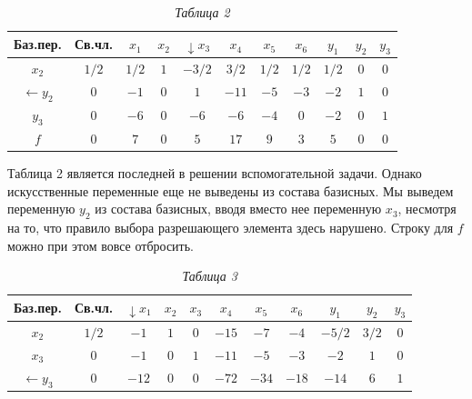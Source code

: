 \begin{table}[h]
\caption*{\hspace{0.8\linewidth} \textit{Таблица 2}}
\begin{center}
\renewcommand{\tabcolsep}{6,4pt}
\begin{tabular}{ | c | c | c | c | c | c | c | c | c | c | c | }
\hline
Баз.пер. & Св.чл. & $x_{1}$ & $x_{2}$ & $\downarrow x_{3}$ & $x_{4}$ & $x_{5}$ & $x_{6}$ & $y_{1}$ & $y_{2}$ & $y_{3}$ \\ \hline
$x_{2}$ & $1/2$ & $1/2$ & $1$ & $-3/2$ & $3/2$ & $1/2$ & $1/2$ & $1/2$ & $0$ & $0$ \\ \hline
$\leftarrow y_{2}$ & $0$ & $-1$ & $0$ & \cellcolor{Gray}$1$ & $-11$ & $-5$ & $-3$ & $-2$ & $1$ & $0$ \\ \hline
$y_{3}$ & $0$ & $-6$ & $0$ & $-6$ & $-6$ & $-4$ & $0$ & $-2$ & $0$ & $1$\\ \hline
$f$ & $0$ & $7$ & $0$ & $5$ & $17$ & $9$ & $3$ & $5$ & $0$ & $0$ \\ \hline
\end{tabular}
\end{center}
\end{table}

Таблица 2 является последней в решении вспомогательной задачи. Однако искусственные переменные еще не выведены из состава базисных. Мы выведем переменную $y_{2}$ из состава базисных, вводя вместо нее переменную $x_{3}$, несмотря на то, что правило выбора разрешающего элемента здесь нарушено. Строку для $f$ можно при этом вовсе отбросить.

\begin{table}[h]
\caption*{\hspace{0.8\linewidth} \textit{Таблица 3}}
\begin{center}
\begin{tabular}{ | c | c | c | c | c | c | c | c | c | c | c | }
\hline
Баз.пер. & Св.чл. & $\downarrow x_{1}$ & $x_{2}$ & $x_{3}$ & $x_{4}$ & $x_{5}$ & $x_{6}$ & $y_{1}$ & $y_{2}$ & $y_{3}$ \\ \hline
$x_{2}$ & $1/2$ & $-1$ & $1$ & $0$ & $-15$ & $-7$ & $-4$ & $-5/2$ & $3/2$ & $0$ \\ \hline
$x_{3}$ & $0$ & $-1$ & $0$ & $1$ & $-11$ & $-5$ & $-3$ & $-2$ & $1$ & $0$ \\ \hline
$\leftarrow y_{3}$ & $0$ & \cellcolor{Gray}$-12$ & $0$ & $0$ & $-72$ & $-34$ & $-18$ & $-14$ & $6$ & $1$\\ \hline
\end{tabular}
\end{center}
\end{table}

